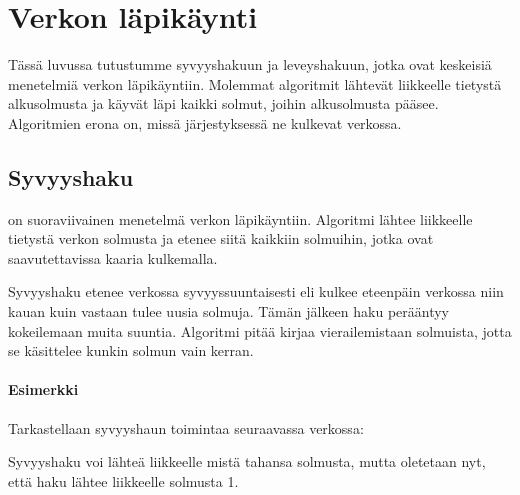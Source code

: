 \chapter{Verkon läpikäynti}

Tässä luvussa tutustumme
syvyyshakuun ja leveyshakuun, jotka
ovat keskeisiä menetelmiä verkon läpikäyntiin.
Molemmat algoritmit lähtevät liikkeelle
tietystä alkusolmusta ja 
käyvät läpi kaikki solmut,
joihin alkusolmusta pääsee.
Algoritmien erona on,
missä järjestyksessä ne kulkevat verkossa.

\section{Syvyyshaku}


on suoraviivainen menetelmä verkon läpikäyntiin.
Algoritmi lähtee liikkeelle tietystä
verkon solmusta ja etenee siitä
kaikkiin solmuihin, jotka ovat
saavutettavissa kaaria kulkemalla.

Syvyyshaku etenee verkossa syvyyssuuntaisesti
eli kulkee eteenpäin verkossa niin kauan
kuin vastaan tulee uusia solmuja.
Tämän jälkeen haku perääntyy kokeilemaan
muita suuntia.
Algoritmi pitää kirjaa vierailemistaan solmuista,
jotta se käsittelee kunkin solmun vain kerran.

\subsubsection*{Esimerkki}

Tarkastellaan syvyyshaun toimintaa
seuraavassa verkossa:
\begin{center}
\end{center}
Syvyyshaku voi lähteä liikkeelle
mistä tahansa solmusta,
mutta oletetaan nyt,
että haku lähtee liikkeelle solmusta 1.

